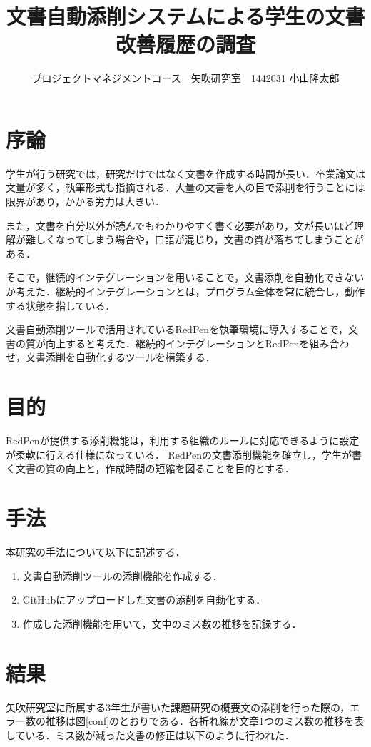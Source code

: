 \documentclass[uplatex,twocolumn,dvipdfmx]{jsarticle}
\title{\vspace{-5mm}\fontsize{14pt}{0pt}\selectfont 文書自動添削システムによる学生の文書改善履歴の調査}
\author{\normalsize プロジェクトマネジメントコース　矢吹研究室　1442031   小山隆太郎}
\date{}
\begin{document}
\fontsize{10.5pt}{\baselineskip}\selectfont
\maketitle





\section{序論}
学生が行う研究では，研究だけではなく文書を作成する時間が長い．卒業論文は文量が多く，執筆形式も指摘される．大量の文書を人の目で添削を行うことには限界があり，かかる労力は大きい．

また，文書を自分以外が読んでもわかりやすく書く必要があり，文が長いほど理解が難しくなってしまう場合や，口語が混じり，文書の質が落ちてしまうことがある．

そこで，継続的インテグレーション\cite{a}を用いることで，文書添削を自動化できないか考えた．継続的インテグレーションとは，プログラム全体を常に統合し，動作する状態を指している．

文書自動添削ツールで活用されているRedPenを執筆環境に導入することで，文書の質が向上すると考えた．継続的インテグレーションとRedPenを組み合わせ，文書添削を自動化するツールを構築する．

\section{目的}
RedPenが提供する添削機能は，利用する組織のルールに対応できるように設定が柔軟に行える仕様になっている．
RedPenの文書添削機能を確立し，学生が書く文書の質の向上と，作成時間の短縮を図ることを目的とする．

\section{手法}
本研究の手法について以下に記述する．
\begin{enumerate}
\item 文書自動添削ツールの添削機能を作成する．
\item GitHubにアップロードした文書の添削を自動化する．
\item 作成した添削機能を用いて，文中のミス数の推移を記録する．
\end{enumerate}

\section{結果}
矢吹研究室に所属する3年生が書いた課題研究の概要文の添削を行った際の，エラー数の推移は図\ref{conf}のとおりである．各折れ線が文章1つのミス数の推移を表している．ミス数が減った文書の修正は以下のように行われた．
\end{document}

